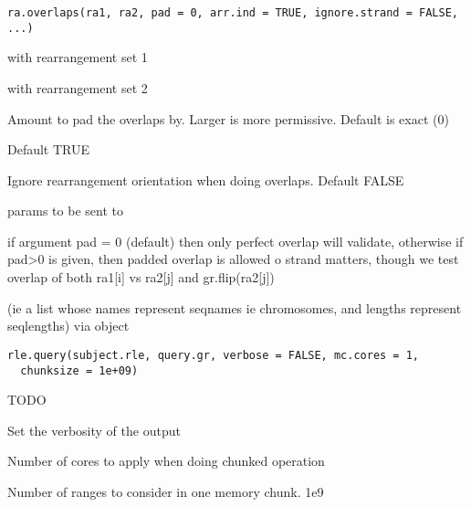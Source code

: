 \documentclass[a4paper]{book}
\begin{document}
%
\begin{Usage}
\begin{verbatim}
ra.overlaps(ra1, ra2, pad = 0, arr.ind = TRUE, ignore.strand = FALSE, ...)
\end{verbatim}
\end{Usage}
%
\begin{Arguments}
\begin{ldescription}
\item[\code{ra1}]  with rearrangement set 1

\item[\code{ra2}]  with rearrangement set 2

\item[\code{pad}] Amount to pad the overlaps by. Larger is more permissive. Default is exact (0)

\item[\code{arr.ind}] Default TRUE

\item[\code{ignore.strand}] Ignore rearrangement orientation when doing overlaps. Default FALSE

\item[\code{...}] params to be sent to 
\end{ldescription}
\end{Arguments}
%
\begin{Details}\relax
if argument pad = 0 (default) then only perfect overlap will validate, otherwise if pad>0 is given, then
padded overlap is allowed
o
strand matters, though we test overlap of both ra1[i] vs ra2[j] and gr.flip(ra2[j])
\end{Details}
%
\begin{Description}\relax
(ie a list whose names represent seqnames ie chromosomes, and lengths represent seqlengths)
via  object
\end{Description}
%
\begin{Usage}
\begin{verbatim}
rle.query(subject.rle, query.gr, verbose = FALSE, mc.cores = 1,
  chunksize = 1e+09)
\end{verbatim}
\end{Usage}
%
\begin{Arguments}
\begin{ldescription}
\item[\code{subject.rle}] 

\item[\code{query.gr}] TODO

\item[\code{verbose}] Set the verbosity of the output

\item[\code{mc.cores}] Number of cores to apply when doing chunked operation

\item[\code{chunksize}] Number of  ranges to consider in one memory chunk. 1e9
\end{ldescription}
\end{Arguments}
\end{document}
